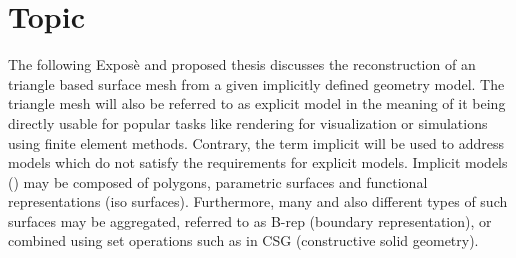 
\section{Topic}

The following Expos\`e and proposed thesis discusses the reconstruction of an triangle based surface mesh from a given implicitly defined geometry model. The triangle mesh will also be referred to as explicit model in the meaning of it being directly usable for popular tasks like rendering for visualization or simulations using finite element methods. Contrary, the term implicit will be used to address models which do not satisfy the requirements for explicit models. Implicit models (\cf \cite{implicit_techniques}) may be composed of polygons, parametric surfaces and functional representations (iso surfaces). Furthermore, many and also different types of such surfaces may be aggregated, referred to as B-rep (boundary representation), or combined using set operations such as in CSG (constructive solid geometry).
